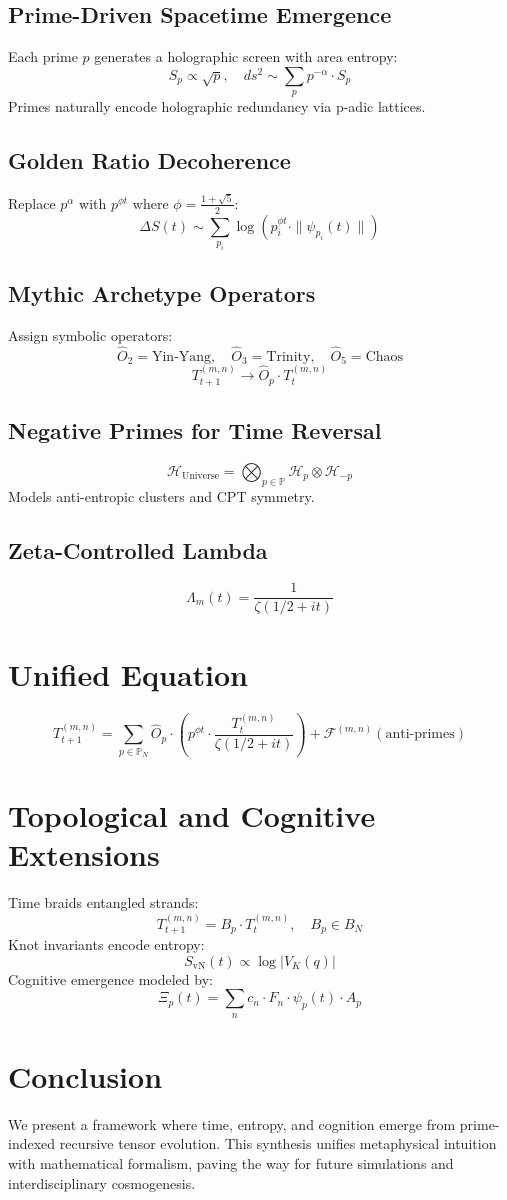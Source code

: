 \documentclass[12pt]{article}
\begin{document}
\subsection{Prime-Driven Spacetime Emergence}
Each prime $p$ generates a holographic screen with area entropy:
\[
S_p \propto \sqrt{p}, \quad ds^2 \sim \sum_p p^{-\alpha} \cdot S_p
\]
Primes naturally encode holographic redundancy via p-adic lattices.

\subsection{Golden Ratio Decoherence}
Replace $p^\alpha$ with $p^{\phi t}$ where $\phi = \frac{1 + \sqrt{5}}{2}$:
\[
\Delta S(t) \sim \sum_{p_i} \log \left( p_i^{\phi t} \cdot \| \psi_{p_i}(t) \| \right)
\]

\subsection{Mythic Archetype Operators}
Assign symbolic operators:
\[
\hat{O}_2 = \text{Yin-Yang}, \quad \hat{O}_3 = \text{Trinity}, \quad \hat{O}_5 = \text{Chaos}
\]
\[
T_{t+1}^{(m,n)} \rightarrow \hat{O}_p \cdot T_t^{(m,n)}
\]

\subsection{Negative Primes for Time Reversal}
\[
\mathcal{H}_\text{Universe} = \bigotimes_{p \in \mathbb{P}} \mathcal{H}_p \otimes \mathcal{H}_{-p}
\]
Models anti-entropic clusters and CPT symmetry.

\subsection{Zeta-Controlled Lambda}
\[
\Lambda_m(t) = \frac{1}{\zeta(1/2 + it)}
\]

\section{Unified Equation}
\[
\boxed{
T_{t+1}^{(m,n)} = \sum_{p \in \mathbb{P}_N} \hat{O}_p \cdot \left( p^{\phi t} \cdot \frac{T_t^{(m,n)}}{\zeta(1/2 + it)} \right) + \mathcal{F}^{(m,n)}( \text{anti-primes} )
}
\]

\section{Topological and Cognitive Extensions}
Time braids entangled strands:
\[
T_{t+1}^{(m,n)} = B_p \cdot T_t^{(m,n)}, \quad B_p \in B_N
\]
Knot invariants encode entropy:
\[
S_{\text{vN}}(t) \propto \log |V_K(q)|
\]
Cognitive emergence modeled by:
\[
\Xi_p(t) = \sum_{n} c_n \cdot F_n \cdot \psi_p(t) \cdot A_p
\]

\section{Conclusion}
We present a framework where time, entropy, and cognition emerge from prime-indexed recursive tensor evolution. This synthesis unifies metaphysical intuition with mathematical formalism, paving the way for future simulations and interdisciplinary cosmogenesis.
\end{document}
